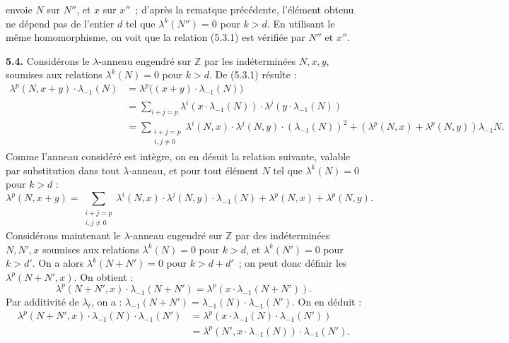 envoie \(N\) sur \(N''\), et \(x\) sur \(x''\)~; d'après la rematque précédente, l'élément obtenu ne dépend pas de l'entier \(d\) tel que \(\lambda^k(N'')=0\) pour \(k>d\). En utilisant le même homomorphisme, on voit que la relation (5.3.1) est vérifiée par \(N''\) et \(x''\).

\textbf{5.4.} Considérons le \(\lambda\)-anneau engendré sur \(\mathbb Z\) par les indéterminées \(N,x,y\), soumises aux relations \(\lambda^k(N)=0\) pour \(k>d\). De (5.3.1) résulte :
\begin{align*}
  \lambda^p(N,x+y)\cdot\lambda_{-1}(N)
  &=\lambda^p\bigl((x+y)\cdot\lambda_{-1}(N)\bigr)\\
  &=\sum_{i+j=p}\lambda^i(x\cdot\lambda_{-1}(N))\cdot\lambda^j(y\cdot\lambda_{-1}(N))\\
  &=\sum_{\substack{i+j=p\\ i,j\ne0}}\lambda^i(N,x)\cdot\lambda^j(N,y)\cdot(\lambda_{-1}(N))^2
    +(\lambda^p(N,x)+\lambda^p(N,y))\lambda_{-1}N.
\end{align*}
Comme l'anneau considéré est intègre, on en désuit la relation suivante, valable par substitution dans tout \(\lambda\)-anneau, et pour tout élément \(N\) tel que \(\lambda^k(N)=0\) pour \(k>d\) :
\begin{equation}\tag{5.4.1}
  \lambda^p(N,x+y)=\sum_{\substack{i+j=p\\ i,j\ne0}}\lambda^i(N,x)\cdot\lambda^j(N,y)\cdot\lambda_{-1}(N)+\lambda^p(N,x)+\lambda^p(N,y).
\end{equation}
Considérons maintenant le \(\lambda\)-anneau engendré sur \(\mathbb Z\) par des indéterminées \(N,N',x\) soumises aux relations \(\lambda^k(N)=0\) pour \(k>d\), et \(\lambda^k(N')=0\) pour \(k>d'\). On a alors \(\lambda^k(N+N')=0\) pour \(k>d+d'\)~; on peut donc définir les \(\lambda^p(N+N',x)\). On obtient :
\[
  \lambda^p(N+N',x)\cdot\lambda_{-1}(N+N')=\lambda^p(x\cdot\lambda_{-1}(N+N')).
\]
Par additivité de \(\lambda_t\), on a : \(\lambda_{-1}(N+N')=\lambda_{-1}(N)\cdot\lambda_{-1}(N')\). On en déduit :
\begin{align*}
  \lambda^p(N+N',x)\cdot\lambda_{-1}(N)\cdot\lambda_{-1}(N')
  &=\lambda^p(x\cdot\lambda_{-1}(N)\cdot\lambda_{-1}(N'))\\
  &=\lambda^p(N',x\cdot\lambda_{-1}(N))\cdot\lambda_{-1}(N').
\end{align*}

